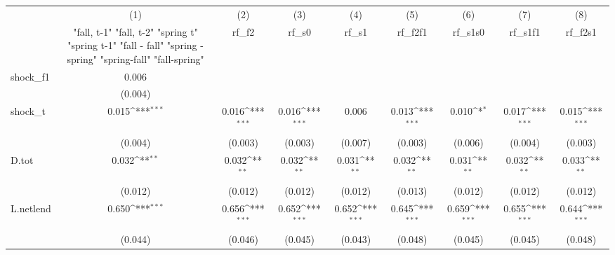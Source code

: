 {
\def\sym#1{\ifmmode^{#1}\else\(^{#1}\)\fi}
\begin{tabular}{l*{8}{c}}
\toprule
            &\multicolumn{1}{c}{(1)}&\multicolumn{1}{c}{(2)}&\multicolumn{1}{c}{(3)}&\multicolumn{1}{c}{(4)}&\multicolumn{1}{c}{(5)}&\multicolumn{1}{c}{(6)}&\multicolumn{1}{c}{(7)}&\multicolumn{1}{c}{(8)}\\
            &\multicolumn{1}{c}{  "fall, t-1" "fall, t-2" "spring t" "spring t-1"  "fall - fall" "spring - spring" "spring-fall" "fall-spring" }&\multicolumn{1}{c}{rf\_f2}&\multicolumn{1}{c}{rf\_s0}&\multicolumn{1}{c}{rf\_s1}&\multicolumn{1}{c}{rf\_f2f1}&\multicolumn{1}{c}{rf\_s1s0}&\multicolumn{1}{c}{rf\_s1f1}&\multicolumn{1}{c}{rf\_f2s1}\\
\midrule
shock\_f1    &       0.006         &                     &                     &                     &                     &                     &                     &                     \\
            &     (0.004)         &                     &                     &                     &                     &                     &                     &                     \\
\addlinespace
shock\_t     &       0.015\sym{***}&       0.016\sym{***}&       0.016\sym{***}&       0.006         &       0.013\sym{***}&       0.010\sym{*}  &       0.017\sym{***}&       0.015\sym{***}\\
            &     (0.004)         &     (0.003)         &     (0.003)         &     (0.007)         &     (0.003)         &     (0.006)         &     (0.004)         &     (0.003)         \\
\addlinespace
D.tot       &       0.032\sym{**} &       0.032\sym{**} &       0.032\sym{**} &       0.031\sym{**} &       0.032\sym{**} &       0.031\sym{**} &       0.032\sym{**} &       0.033\sym{**} \\
            &     (0.012)         &     (0.012)         &     (0.012)         &     (0.012)         &     (0.013)         &     (0.012)         &     (0.012)         &     (0.012)         \\
\addlinespace
L.netlend   &       0.650\sym{***}&       0.656\sym{***}&       0.652\sym{***}&       0.652\sym{***}&       0.645\sym{***}&       0.659\sym{***}&       0.655\sym{***}&       0.644\sym{***}\\
            &     (0.044)         &     (0.046)         &     (0.045)         &     (0.043)         &     (0.048)         &     (0.045)         &     (0.045)         &     (0.048)         \\

\end{tabular}}

